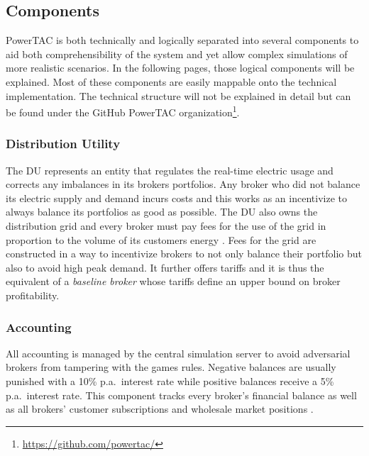 \subsection{Components}%
\label{sub:components}



\ac{PowerTAC} is both technically and logically separated into several components to aid both comprehensibility of the
system and yet allow complex simulations of more realistic scenarios. In the following pages, those logical components
will be explained. Most of these components are easily mappable onto the technical implementation. The technical
structure will not be explained in detail but can be found under the GitHub \ac{PowerTAC}
organization\footnote{\url{https://github.com/powertac/}}.


\subsubsection{Distribution Utility} The \ac{DU} represents an entity that regulates the real-time electric usage and
corrects any imbalances in its brokers portfolios. Any broker who did not balance its electric supply and demand incurs
costs and this works as an incentivize to always balance its portfolios as good as possible. The \ac{DU} also owns the
distribution grid and every broker must pay fees for the use of the grid in proportion to the volume of its customers
energy \citep[p.10]{ketter2018powertac}. Fees for the grid are constructed in a way to incentivize
brokers to not only balance their portfolio but also to avoid high peak demand. It further offers tariffs and it is
thus the equivalent of a \emph{baseline broker} whose tariffs define an upper bound on broker profitability.

\subsubsection{Accounting} All accounting is managed by the central simulation server to avoid adversarial brokers
from tampering with the games rules. Negative balances are usually punished with a 10\% p.a.\ interest rate while
positive balances receive a 5\% p.a.\ interest rate. This component tracks every broker's financial balance as well as
all brokers' customer subscriptions and wholesale market positions \citep[p.11]{ketter2018powertac}.

